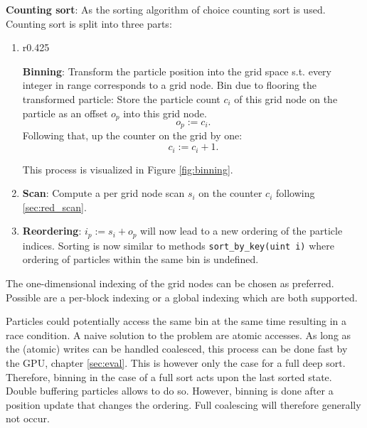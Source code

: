 \documentclass[m,times]{cgMA}
\begin{document}
\textbf{Counting sort}: As the sorting algorithm of choice counting sort is used.
Counting sort is split into three parts:
\begin{enumerate}
  \item
\parbox[t]{\dimexpr\textwidth-\leftmargin}{%
      \vspace{-7.5}
      \begin{wrapfigure}[10]{r}{0.425\textwidth}
	\vspace{-33}
 
  \caption{Binning: Particle adds one to $c_i$ after storing it as $o_p$.}
  \label{fig:binning}
\end{wrapfigure}
\textbf{Binning}: Transform the particle position into the grid space s.t. every integer in range corresponds to a grid node. Bin due to flooring the transformed particle: Store the particle count $c_i$ of this grid node on the particle as an offset $o_p$ into this grid node.$$o_p := c_i.$$Following that, up the counter on the grid by one:$$c_i := c_i +1.$$
}
This process is visualized in Figure \ref{fig:binning}.
  \item \textbf{Scan}: Compute a per grid node scan $s_i$ on the counter $c_i$ following \ref{sec:red_scan}.

  \item \textbf{Reordering}: $i_p := s_i + o_p$ will now lead to a new ordering of the particle indices. Sorting is now similar to methods \texttt{sort\_by\_key(uint i)} where ordering of particles within the same bin is undefined.
\end{enumerate}
\begin{flushright}\cite{NVIDIA:NNSEARCH}\cite{MPM:GPU}\end{flushright}

The one-dimensional indexing of the grid nodes can be chosen as preferred. Possible are a per-block indexing or a global indexing which are both supported.

Particles could potentially access the same bin at the same time resulting in a race condition. A naive solution to the problem are atomic accesses. As long as the (atomic) writes can be handled coalesced, this process can be done fast by the GPU, chapter \ref{sec:eval}. This is however only the case for a full deep sort. Therefore, binning in the case of a full sort acts upon the last sorted state. Double buffering particles allows to do so. However, binning is done after a position update that changes the ordering. Full coalescing will therefore generally not occur.
\end{document}
